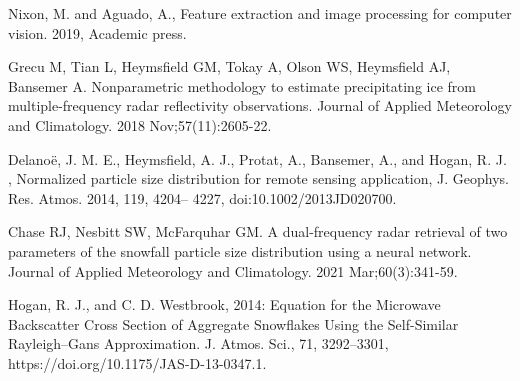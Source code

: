 \documentclass[12pt]{article}
\begin{document}
\begin{thebibliography}{999}
  Nixon, M. and Aguado, A., Feature extraction and image processing for computer vision. 2019, Academic press.

  Grecu M, Tian L, Heymsfield GM, Tokay A, Olson WS, Heymsfield AJ, Bansemer A. Nonparametric methodology to estimate precipitating ice from multiple-frequency radar reflectivity observations. Journal of Applied Meteorology and Climatology. 2018 Nov;57(11):2605-22.

  Delanoë, J. M. E., Heymsfield, A. J., Protat, A., Bansemer, A., and Hogan, R. J. , Normalized particle size distribution for remote sensing application, J. Geophys. Res. Atmos. 2014, 119, 4204– 4227, doi:10.1002/2013JD020700.

  Chase RJ, Nesbitt SW, McFarquhar GM. A dual-frequency radar retrieval of two parameters of the snowfall particle size distribution 
  using a neural network. Journal of Applied Meteorology and Climatology. 2021 Mar;60(3):341-59.

  Hogan, R. J., and C. D. Westbrook, 2014: Equation for the Microwave Backscatter Cross Section of Aggregate Snowflakes Using the Self-Similar Rayleigh–Gans Approximation. J. Atmos. Sci., 71, 3292–3301, https://doi.org/10.1175/JAS-D-13-0347.1. 

\end{thebibliography}
\end{document}

